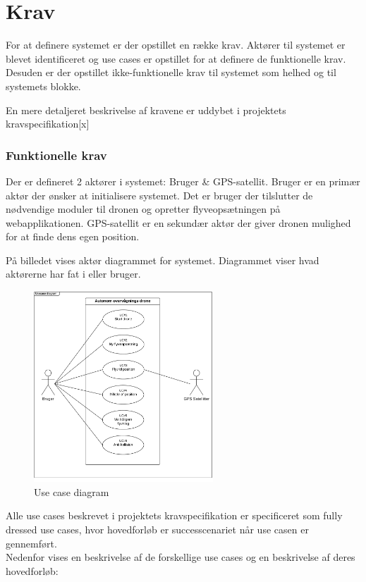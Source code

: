 \chapter{Krav}

For at definere systemet er der opstillet en række krav. Aktører til systemet er blevet identificeret og use cases er opstillet for at definere de funktionelle krav. Desuden er der opstillet ikke-funktionelle krav til systemet som helhed og til systemets blokke.\newline

En mere detaljeret beskrivelse af kravene er uddybet i projektets kravspecifikation[x]

\subsection{Funktionelle krav}
Der er defineret 2 aktører i systemet: Bruger \& GPS-satellit.
Bruger er en primær aktør der ønsker at initialisere systemet. Det er bruger der tilslutter de nødvendige moduler til dronen og opretter flyveopsætningen på webapplikationen.
GPS-satellit er en sekundær aktør der giver dronen mulighed for at finde dens egen position. 

På billedet vises aktør diagrammet for systemet. Diagrammet viser hvad aktørerne har fat i eller bruger.
\begin{figure}[H]
	\centering
	\includegraphics[width=0.60\textwidth]{Billeder/Krav/Use_case_diagram}
	\caption{Use case diagram}
	\label{fig:useCaseDiagram}
\end{figure}

Alle use cases beskrevet i projektets kravspecifikation er specificeret som fully dressed use cases, hvor hovedforløb er successcenariet når use casen er gennemført. \\
Nedenfor vises en beskrivelse af de forskellige use cases og en beskrivelse af deres hovedforløb:

